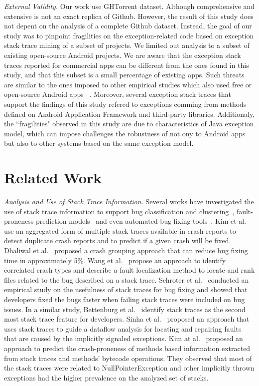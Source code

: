 \documentclass[conference]{IEEEtran}
\begin{document}
\noindent\emph{External Validity.} Our work use GHTorrent dataset. Although 
comprehensive and extensive is not an exact replica of Github. 
However, the result of this study does not depent on the analysis of
a complete Github dataset. Instead, the goal of our study was to 
pinpoint fragilities on the exception-related code based on 
exception stack trace mining of a subset of projects.
We limited out analysis to a subset of existing open-source Android projects.
We are aware that the exception stack traces reported 
for commercial apps can be different from the ones found in this study, and that
this subset is a small percentage of existing apps.
Such threats are similar to the ones imposed to other empirical studies 
which also used free or open-source Android apps ~\cite{Linar13,McDon13,ahimed}.
Moreover, several exception stack traces that support the findings of this study
refered to exceptions comming from methods defined on Android Application Framework
and third-party libraries.  Additionaly,  the ``fragilities" observed in this study are due to
characteristics of Java exception model, which can impose challenges 
the robustness of not ony to Android apps but also to other systems
 based on the same exception model. 


\section{Related Work}
\label{sec:rele}

\textit{Analysis and Use of Stack Trace Information.} Several works have
investigated the use of stack trace information to support bug classification
and clustering~\cite{wang2013improving, kim2011crash, dhaliwal2011classifying},
fault-proneness prediction models~\cite{kim2013predicting} and even automated
bug fixing tools~\cite{sinha2009fault}. Kim et al.~\cite{kim2011crash} use an
aggregated form of multiple stack traces available in crash reports to detect
duplicate crash reports and to predict if a given crash will be fixed. Dhaliwal
et al.~\cite{dhaliwal2011classifying} proposed a crash grouping approach that
can reduce bug fixing time in approximately 5\%. Wang et
al.~\cite{wang2013improving} propose an approach to identify correlated crash
types and describe a fault localization method to locate and rank files related
to the bug described on a stack trace. Schroter et al.~\cite{schroter2010stack}
conducted an empirical study on the usefulness of stack traces for bug fixing
and showed that developers fixed the bugs faster when failing stack traces were
included on bug issues.  In a similar study, Bettenburg et
al.~\cite{bettenburg2008makes} identify stack traces as the second most stack
trace feature for developers.  Sinha et al.~\cite{sinha2009fault} proposed an
approach that uses stack traces to guide a dataflow analysis for locating and
repairing faults that are caused by the implicitly signaled exceptions. Kim
at al.~\cite{kim2013predicting} proposed an approach to predict the
crash-proneness of methods based information extracted from stack traces and
methods' bytecode operations.  They observed that most of the stack traces were
related to NullPointerException and other implicitly thrown exceptions had
the higher prevalence on the analyzed set of stacks.
\end{document}
